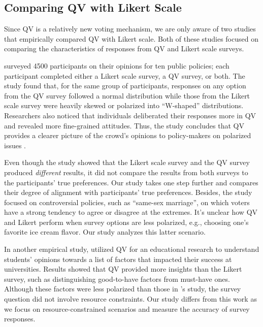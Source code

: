 \subsection{Comparing QV with Likert Scale}
Since QV is a relatively new voting mechanism, we are only aware of two studies that empirically compared QV with Likert scale. Both of these studies focused on comparing the characteristics of responses from QV and Likert scale surveys.

\textcite{quarfoot2017quadratic} surveyed 4500 participants on their opinions for ten public policies; each participant completed either a Likert scale survey, a QV survey, or both.  The study found that, for the same group of participants, responses on any option from the QV survey followed a normal distribution while those from the Likert scale survey were heavily skewed or polarized into ``W-shaped'' distributions. Researchers also noticed that individuals deliberated their responses more in QV and revealed more fine-grained attitudes. Thus, the study concludes that QV provides a clearer picture of the crowd's opinions to policy-makers on polarized issues \cite{quarfoot2017quadratic}. 

Even though the study showed that the Likert scale survey and the QV survey produced \textit{different} results, it did not compare the results from both surveys to the participants' true preferences. Our study takes one step further and compares their degree of alignment with participants' true preferences. Besides, the study focused on controversial policies, such as ``same-sex marriage'', on which voters have a strong tendency to agree or disagree at the extremes. It's unclear how QV and Likert perform when survey options are less polarized, e.g., choosing one's favorite ice cream flavor. Our study analyzes this latter scenario.

In another empirical study, \textcite{naylor2017first} utilized QV for an educational research to understand students' opinions towards a list of factors that impacted their success at universities. Results showed that QV provided more insights than the Likert survey, such as distinguishing good-to-have factors from must-have ones. Although these factors were less polarized than those in \citeauthor{quarfoot2017quadratic}'s study, the survey question did not involve resource constraints. Our study differs from this work as we focus on resource-constrained scenarios and measure the accuracy of survey responses.

